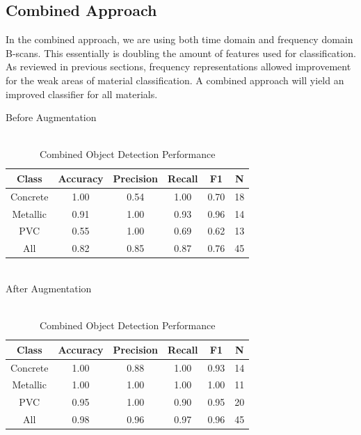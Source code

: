 \subsection{Combined Approach}
\hspace{0.5in}In the combined approach, we are using both time domain and frequency domain B-scans. This essentially is doubling the amount of features used for classification. As reviewed in previous sections, frequency representations allowed improvement for the weak areas of material classification. A combined approach will yield an improved classifier for all materials. 
\vspace{0.5\baselineskip}

\begin{table}[H]
\begin{center}
    \caption{\\Combined Object Detection Performance}
    \label{table:combined_table}
    Before Augmentation\\
    \begin{tabular}{ |c|c|c|c|c|c|}
        \hline
        Class & Accuracy & Precision & Recall & F1 & N \\
        \hline
        Concrete & 1.00 & 0.54 & 1.00 & 0.70 & 18\\ 
        Metallic & 0.91 & 1.00 & 0.93 & 0.96 & 14\\  
        PVC      & 0.55 & 1.00 & 0.69 & 0.62 & 13\\
        \hline
        All      & 0.82 & 0.85 & 0.87 & 0.76 & 45\\
        \hline
    \end{tabular}\\
    After Augmentation\\
    \begin{tabular}{ |c|c|c|c|c|c|}
        \hline
        Class & Accuracy & Precision & Recall & F1 & N \\
        \hline
        Concrete & 1.00 & 0.88 & 1.00 & 0.93 & 14\\ 
        Metallic & 1.00 & 1.00 & 1.00 & 1.00 & 11\\  
        PVC      & 0.95 & 1.00 & 0.90 & 0.95 & 20\\
        \hline
        All      & 0.98 & 0.96 & 0.97 & 0.96 & 45\\
        \hline
    \end{tabular}
\end{center}
\end{table}

